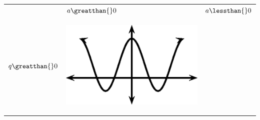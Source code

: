 \setlength\mytablespace{6\tabcolsep}
\addtolength\mytablespace{4\arrayrulewidth}
\setlength\mytablewidth{\linewidth}
\setlength\mytableroom{\mytablewidth}
\addtolength\mytableroom{-\mytablespace}
\setlength\myfixedwidth{0pt}
\setlength\mystarwidth{\mytableroom}
\addtolength\mystarwidth{-\myfixedwidth}
\divide{}
\begin{center}
\label{m39414*uid65}
\noindent
{}
\tablelasttail{}
\begin{xtabular*}{\mytablewidth}[t]{|p{10\mystarwidth}|p{10\mystarwidth}|p{10\mystarwidth}|}\hline
&
    $a\greatthan{}0$
    &
    $a\lessthan{}0$
\tabularnewline{}
    $q\greatthan{}0$
    &
\setcounter{subfigure}{0}
\label{m39414*id88184}
\begin{center}
\label{m39414*id88184!!!underscore!!!media}\label{m39414*id88184!!!underscore!!!printimage}\includegraphics{col11306.imgs/m39414_MG10C15_026.png} %

\end{center}
\end{xtabular*}
\end{center}
